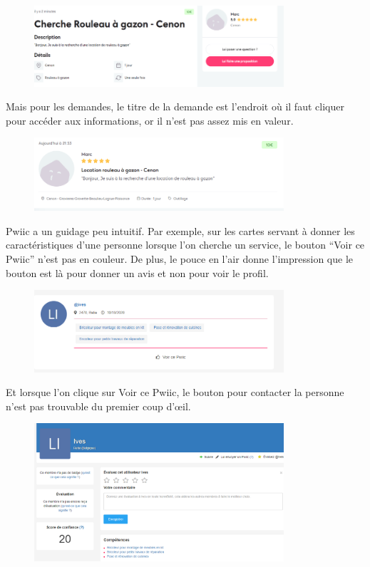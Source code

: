 \documentclass[a4paper,11pt]{article}
\begin{document}
\begin{figure}[H]
  \includegraphics[width=350px]{images/Guidage-allovoisins.png}
  \label{fig:Guidage-allovoisins}
\end{figure}

Mais pour les demandes, le titre de la demande est l’endroit où il faut cliquer pour accéder aux informations,
or il n’est pas assez mis en valeur.\\

\begin{figure}[H]
  \includegraphics[width=350px]{images/demande-allovoisins.png}
  \label{fig:demande-allovoisins}
\end{figure}

Pwiic a un guidage peu intuitif. Par exemple, sur les cartes servant à donner les caractéristiques d’une personne
lorsque l’on cherche un service, le bouton “Voir ce Pwiic” n’est pas en couleur. De plus, le pouce en l’air donne
l’impression que le bouton est là pour donner un avis et non pour voir le profil.\\

\begin{figure}[H]
  \includegraphics[width=350px]{images/guidage-pwiic.png}
  \label{fig:guidage-pwiic}
\end{figure}

Et lorsque l’on clique sur Voir ce Pwiic, le bouton pour contacter la personne n’est pas trouvable du premier coup d’œil.\\

\begin{figure}[H]
  \includegraphics[width=350px]{images/voir-ce-pwiic.png}
  \label{fig:voir-ce-pwiic}
\end{figure}
\end{document}
